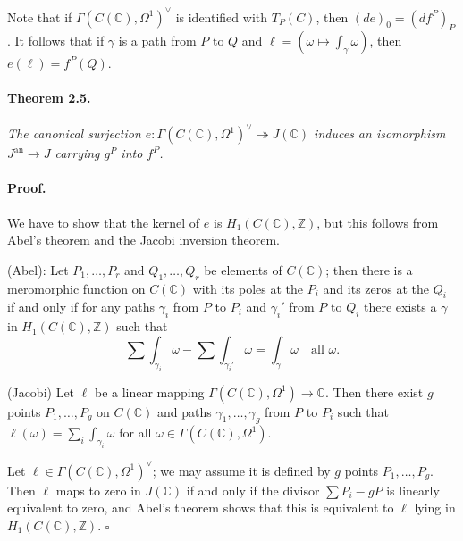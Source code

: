 Note that if $\Gamma(C(\mathbb{C}), \Omega^1)^\vee$ is identified with
$T_P(C)$, then $(de)_0 = (df^P)_P$. It follows that if $\gamma$ is a path
from $P$ to $Q$ and $\ell = (\omega \mapsto \int_\gamma \omega)$, then
$e(\ell) = f^P(Q)$.

\paragraph{Theorem 2.5.}
\textit{The canonical surjection
$e \colon \Gamma(C(\mathbb{C}), \Omega^1)^\vee \twoheadrightarrow
J(\mathbb{C})$ induces an isomorphism $J^{\mathrm{an}} \to J$ carrying
$g^P$ into $f^P$.}

\paragraph{Proof.}
We have to show that the kernel of $e$ is $H_1(C(\mathbb{C}), \mathbb{Z})$,
but this follows from Abel's theorem and the Jacobi inversion theorem.

(Abel): Let $P_1, \ldots, P_r$ and $Q_1, \ldots, Q_r$ be elements of
$C(\mathbb{C})$; then there is a meromorphic function on $C(\mathbb{C})$
with its poles at the $P_i$ and its zeros at the $Q_i$ if and only if for any
paths $\gamma_i$ from $P$ to $P_i$ and $\gamma_i'$ from $P$ to $Q_i$ there
exists a $\gamma$ in $H_1(C(\mathbb{C}), \mathbb{Z})$ such that
\[
  \sum \int_{\gamma_i} \omega - \sum \int_{\gamma_i'} \omega
  = \int_\gamma \omega \quad \text{all } \omega.
\]

(Jacobi) Let $\ell$ be a linear mapping
$\Gamma(C(\mathbb{C}), \Omega^1) \to \mathbb{C}$. Then there exist $g$
points $P_1, \ldots, P_g$ on $C(\mathbb{C})$ and paths
$\gamma_1, \ldots, \gamma_g$ from $P$ to $P_i$ such that
$\ell(\omega) = \sum_i \int_{\gamma_i} \omega$ for all
$\omega \in \Gamma(C(\mathbb{C}), \Omega^1)$.

Let $\ell \in \Gamma(C(\mathbb{C}), \Omega^1)^\vee$; we may assume it is
defined by $g$ points $P_1, \ldots, P_g$. Then $\ell$ maps to zero in
$J(\mathbb{C})$ if and only if the divisor $\sum P_i-gP$ is linearly
equivalent to zero, and Abel's theorem shows that this is equivalent to
$\ell$ lying in $H_1(C(\mathbb{C}), \mathbb{Z})$. \hfill $\square$
